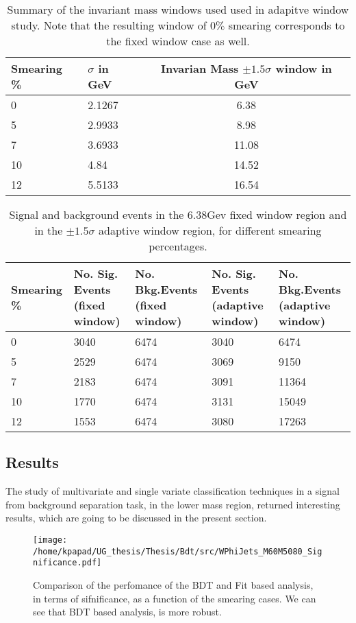 \begin{table}[h]
\centering
\begin{tabular}{|p{2cm}|p{2cm}|c|}
 \hline
Smearing \%  & $\sigma$ in GeV & Invarian Mass $\pm 1.5\sigma$ window  in GeV \\
\hline
0 & 2.1267 & 6.38 \\
5 & 2.9933 & 8.98 \\
7 & 3.6933 & 11.08 \\
10 & 4.84 & 14.52 \\
12 & 5.5133 & 16.54 \\
 \hline
\end{tabular}
\caption{Summary of the invariant mass windows used used in adapitve window study. Note that the resulting window of $0\%$ smearing corresponds to the fixed window case as well.}
\label{table:LightAdaSigmas}
\end{table}

\begin{table}[h!]
\centering
\begin{tabular}{|p{2cm}|p{3cm}|p{3cm}|p{3cm}|p{3cm}|}
 \hline
Smearing \%  & No. Sig. Events (fixed window) & No. Bkg.Events (fixed window) & No. Sig. Events (adaptive window) & No. Bkg.Events (adaptive window)  \\
\hline
0 & 3040 & 6474 & 3040 & 6474 \\
5 & 2529 & 6474 & 3069 & 9150 \\
7 & 2183 & 6474 & 3091 & 11364 \\
10 & 1770 & 6474 & 3131 & 15049 \\
12 & 1553 & 6474 & 3080 & 17263 \\
 \hline
\end{tabular}
\caption{Signal and background events in the 6.38Gev fixed window region and in the $\pm 1.5\sigma$ adaptive window region, for different smearing percentages.}
\label{table:LightNumSigBkg}
\end{table}

\subsection{Results}
\label{sec:orgf65369b}
The study of multivariate and single variate classification techniques in a signal from background separation task, in the lower mass region, returned interesting results, which are going to be discussed in the present section. 
\begin{figure}[h]
\centering
\texttt{[image: /home/kpapad/UG\_thesis/Thesis/Bdt/src/WPhiJets\_M60M5080\_Significance.pdf]}
\caption{ Comparison of the perfomance of the BDT and Fit based analysis, in terms of sifnificance,  as a function of the smearing cases. We can see that BDT based analysis, is more robust.}
\label{fig:LightBdtFitSig}
\end{figure}

